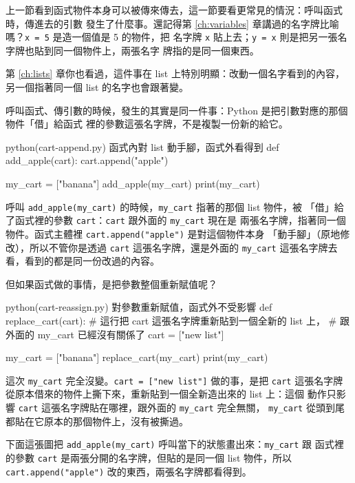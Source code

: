 上一節看到函式物件本身可以被傳來傳去，這一節要看更常見的情況：呼叫函式時，傳進去的引數
發生了什麼事。還記得第 \ref{ch:variables} 章講過的名字牌比喻嗎？\texttt{x = 5} 是造一個值是 5 的物件，把
名字牌 \texttt{x} 貼上去；\texttt{y = x} 則是把另一張名字牌也貼到同一個物件上，兩張名字
牌指的是同一個東西。

第 \ref{ch:lists} 章你也看過，這件事在 list 上特別明顯：改動一個名字看到的內容，另一個指著同一個 list
的名字也會跟著變。

呼叫函式、傳引數的時候，發生的其實是同一件事：Python 是把引數對應的那個物件「借」給函式
裡的參數這張名字牌，不是複製一份新的給它。

\begin{example}{python}{(cart-append.py) 函式內對 list 動手腳，函式外看得到}
def add_apple(cart):
    cart.append("apple")


my_cart = ["banana"]
add_apple(my_cart)
print(my_cart)
\end{example}


呼叫 \texttt{add\_apple(my\_cart)} 的時候，\texttt{my\_cart} 指著的那個 list 物件，被
「借」給了函式裡的參數 \texttt{cart}：\texttt{cart} 跟外面的 \texttt{my\_cart} 現在是
兩張名字牌，指著同一個物件。函式主體裡 \texttt{cart.append("apple")} 是對這個物件本身
「動手腳」（原地修改），所以不管你是透過 \texttt{cart} 這張名字牌，還是外面的
\texttt{my\_cart} 這張名字牌去看，看到的都是同一份改過的內容。

但如果函式做的事情，是把參數整個重新賦值呢？

\begin{example}{python}{(cart-reassign.py) 對參數重新賦值，函式外不受影響}
def replace_cart(cart):
    # 這行把 cart 這張名字牌重新貼到一個全新的 list 上，
    # 跟外面的 my_cart 已經沒有關係了
    cart = ["new list"]


my_cart = ["banana"]
replace_cart(my_cart)
print(my_cart)
\end{example}

\iosample{}{['banana'] \\}

這次 \texttt{my\_cart} 完全沒變。\texttt{cart = ["new list"]} 做的事，是把
\texttt{cart} 這張名字牌從原本借來的物件上撕下來，重新貼到一個全新造出來的 list 上：這個
動作只影響 \texttt{cart} 這張名字牌貼在哪裡，跟外面的 \texttt{my\_cart} 完全無關，
\texttt{my\_cart} 從頭到尾都貼在它原本的那個物件上，沒有被撕過。

下面這張圖把 \texttt{add\_apple(my\_cart)} 呼叫當下的狀態畫出來：\texttt{my\_cart} 跟
函式裡的參數 \texttt{cart} 是兩張分開的名字牌，但貼的是同一個 list 物件，所以
\texttt{cart.append("apple")} 改的東西，兩張名字牌都看得到。

